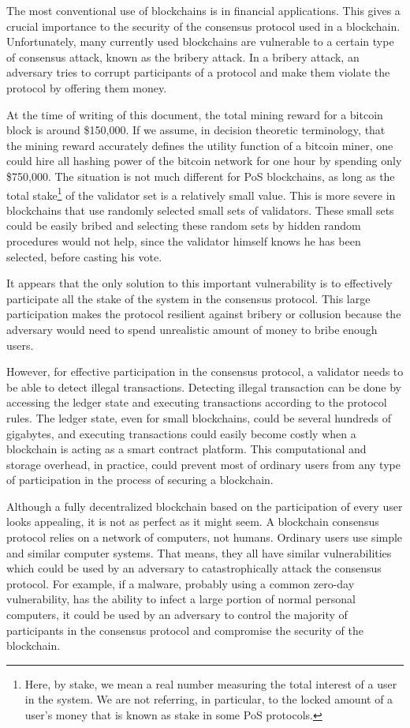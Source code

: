 The most conventional use of blockchains is in financial applications. This gives a crucial importance to the
security of the consensus protocol used in a blockchain. Unfortunately, many currently used blockchains are
vulnerable to a
certain type of consensus attack, known as the bribery attack. In a bribery attack, an adversary tries to corrupt
participants of a protocol and make them violate the protocol by offering them money.

At the time of writing of this document,
the total mining reward for a bitcoin block is around \$150,000. If we assume, in decision theoretic terminology,
that the mining reward accurately defines the utility function of a bitcoin miner, one could hire all hashing power
of the bitcoin network for one hour by
spending only \$750,000. The situation is not much different for PoS blockchains, as long as the total
stake\footnote{Here, by
stake, we mean a real number measuring the total interest of a user in the system. We are not referring, in
particular, to the locked amount of a user's money that is known as stake in some PoS protocols.}
of the validator set is a relatively small value. This is more severe in blockchains that use
randomly selected small sets of validators. These small sets could be easily bribed and selecting these random sets
by hidden random procedures would not help, since the validator himself knows he has been selected, before casting
his vote.

It appears that the only solution to this important vulnerability is to effectively participate all the stake of the
system in the consensus protocol. This large participation makes the protocol resilient against bribery or
collusion because the adversary would need to spend unrealistic amount of money to bribe enough users.

However, for effective participation in the consensus protocol, a validator needs to be able to detect
illegal transactions. Detecting illegal transaction can be done by accessing the ledger
state and executing transactions according to the protocol rules. The
ledger state, even for small blockchains, could be several
hundreds of gigabytes, and executing transactions could easily become costly when a blockchain is acting as a
smart contract platform. This computational and storage overhead, in practice, could prevent most of
ordinary users from any type of participation in the process of securing a blockchain.

Although a fully decentralized blockchain based on the participation of every user looks appealing, it is not as perfect
as it might seem. A blockchain consensus protocol relies on a network of computers, not humans. Ordinary users use
simple and similar computer systems. That means, they all have similar vulnerabilities which could be used by an
adversary to catastrophically attack the consensus protocol. For example, if a malware, probably using a common zero-day
vulnerability, has the ability to infect a large portion of normal personal computers, it could be used by an
adversary to control the majority of participants in the consensus protocol and compromise the security of the
blockchain.

